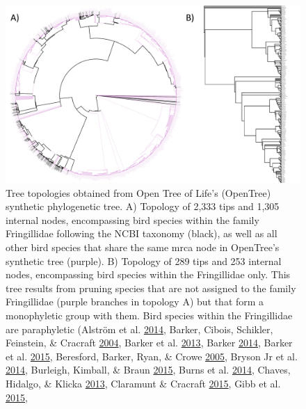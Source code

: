 \begin{figure}[!h]
\includegraphics{../figures/fringillidae-topologies/fringillidae-topology.pdf}
\caption{Tree topologies obtained from Open Tree of Life's (OpenTree) synthetic phylogenetic tree.
A) Topology of 2,333 tips and 1,305 internal nodes, encompassing bird species within the family Fringillidae following the NCBI taxonomy (black), as well as all other bird species that share the same mrca node in OpenTree's synthetic tree (purple).
B) Topology of 289 tips and 253 internal nodes, encompassing bird species within the Fringillidae only.
This tree results from pruning species that are not assigned to the family Fringillidae (purple branches in topology A) but that form a monophyletic group with them.
Bird species within the Fringillidae are paraphyletic
(Alström et al. \protect\hyperlink{ref-}{2014},
Barker, Cibois, Schikler, Feinstein, \& Cracraft \protect\hyperlink{ref-barker2004phylogeny}{2004},
Barker et al. \protect\hyperlink{ref-barker2013going}{2013},
Barker \protect\hyperlink{ref-barker2014mitogenomic}{2014},
Barker et al. \protect\hyperlink{ref-barker2015new}{2015},
Beresford, Barker, Ryan, \& Crowe \protect\hyperlink{ref-beresford2005african}{2005},
Bryson Jr et al. \protect\hyperlink{ref-bryson2014diversification}{2014},
Burleigh, Kimball, \& Braun \protect\hyperlink{ref-burleigh2015building}{2015},
Burns et al. \protect\hyperlink{ref-burns2014phylogenetics}{2014},
Chaves, Hidalgo, \& Klicka \protect\hyperlink{ref-chaves2013biogeography}{2013},
Claramunt \& Cracraft \protect\hyperlink{ref-claramunt2015new}{2015},
Gibb et al. \protect\hyperlink{ref-gibb2015new}{2015},
}
\end{figure}
